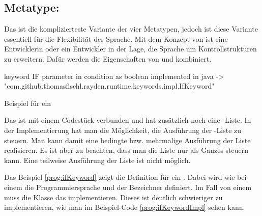 
\subsection{Metatype: }

Das  ist die komplizierteste Variante der vier Metatypen, jedoch ist diese Variante essentiell für die Flexibilität der Sprache. Mit dem Konzept von  ist eine Entwicklerin oder ein Entwickler in der Lage, die Sprache um Kontrollstrukturen zu erweitern. Dafür werden die Eigenschaften von  und  kombiniert. 

\begin{program}
\begin{JavaCode}
keyword IF { 
	parameter in condition as boolean
	implemented in java -> "com.github.thomasfischl.rayden.runtime.keywords.impl.IfKeyword"
}
\end{JavaCode}
\caption{Beispiel für ein }
\label{prog:ifKeyword}
\end{program}

\SuperPar
Das  ist mit einem Codestück verbunden und hat zusätzlich noch eine -Liste. In der Implementierung hat man die Möglichkeit, die Ausführung der -Liste zu steuern. Man kann damit eine bedingte bzw. mehrmalige Ausführung der Liste realisieren. Es ist aber zu beachten, dass man die Liste nur als Ganzes steuern kann. Eine teilweise Ausführung der Liste ist nicht möglich.

\SuperPar
Das Beispiel \ref{prog:ifKeyword} zeigt die Definition für ein . Dabei wird wie bei einem  die Programmiersprache und der Bezeichner definiert. Im Fall von einem  muss die Klasse das   implementieren. Dieses  ist deutlich schwieriger zu implementieren, wie man im Beispiel-Code \ref{prog:ifKeywordImpl} sehen kann.

